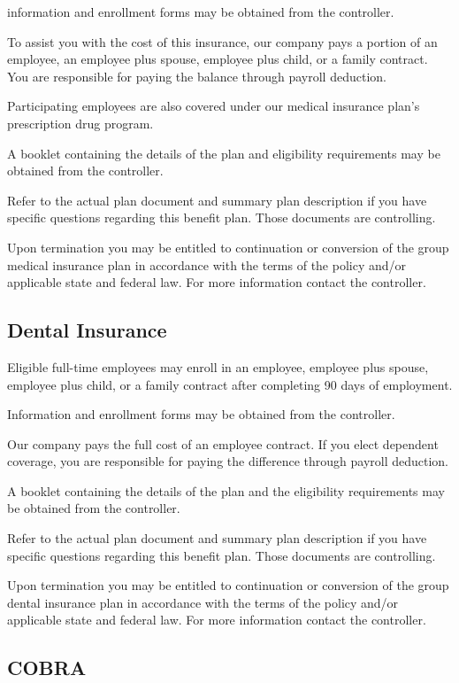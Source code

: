 information and enrollment forms may be obtained from the controller.

To assist you with the cost of this insurance, our company pays a portion of an employee, an employee plus spouse, employee plus child, or a family contract. You are responsible for paying the balance through payroll deduction.

Participating employees are also covered under our medical insurance plan's prescription drug program.

A booklet containing the details of the plan and eligibility requirements may be obtained from the controller.

Refer to the actual plan document and summary plan description if you have specific questions regarding this benefit plan. Those documents are controlling.

Upon termination you may be entitled to continuation or conversion of the group medical insurance plan in accordance with the terms of the policy and/or applicable state and federal law. For more information contact the controller.

\subsection{Dental Insurance}

Eligible full-time employees may enroll in an employee, employee plus spouse, employee plus child, or a family contract after completing 90 days of employment.

Information and enrollment forms may be obtained from the controller.

Our company pays the full cost of an employee contract. If you elect dependent coverage, you are responsible for paying the difference through payroll deduction.

A booklet containing the details of the plan and the eligibility requirements may be obtained from the controller.

Refer to the actual plan document and summary plan description if you have specific questions regarding this benefit plan. Those documents are controlling.

Upon termination you may be entitled to continuation or conversion of the group dental insurance plan in accordance with the terms of the policy and/or applicable state and federal law. For more information contact the controller.

\subsection{COBRA}

